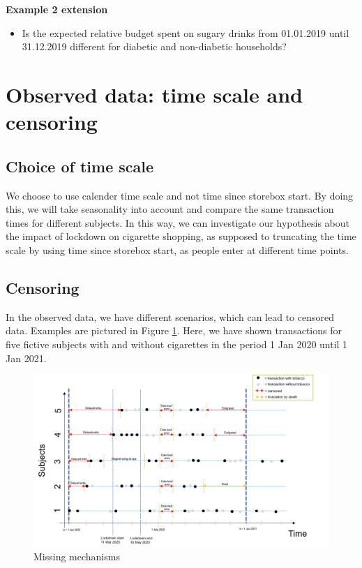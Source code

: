\documentclass[
  11pt,
]{article}
\providecommand{\tightlist}{%
  \setlength{\itemsep}{0pt}\setlength{\parskip}{0pt}}
\begin{document}
\textbf{Example 2 extension}

\begin{itemize}
\tightlist
\item
  Is the expected relative budget spent on sugary drinks from 01.01.2019
  until 31.12.2019 different for diabetic and non-diabetic households?
\end{itemize}

\hypertarget{observed-data-time-scale-and-censoring}{%
\section{Observed data: time scale and
censoring}\label{observed-data-time-scale-and-censoring}}

\hypertarget{choice-of-time-scale}{%
\subsection{Choice of time scale}\label{choice-of-time-scale}}

We choose to use calender time scale and not time since storebox start.
By doing this, we will take seasonality into account and compare the
same transaction times for different subjects. In this way, we can
investigate our hypothesis about the impact of lockdown on cigarette
shopping, as supposed to truncating the time scale by using time since
storebox start, as people enter at different time points.

\hypertarget{censoring}{%
\subsection{Censoring}\label{censoring}}

In the observed data, we have different scenarios, which can lead to
censored data. Examples are pictured in Figure \ref{missing}. Here, we
have shown transactions for five fictive subjects with and without
cigarettes in the period 1 Jan 2020 until 1 Jan 2021.

\begin{center}
\begin{figure}
\includegraphics[]{MissingData.png}
\caption{Missing mechanisms}
\label{missing}
\end{figure}
\end{center}
\end{document}
